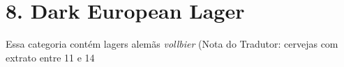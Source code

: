 \section*{8. Dark European Lager}

Essa categoria contém lagers alemãs \textit{vollbier} (Nota do Tradutor: cervejas com extrato entre 11 e 14%
